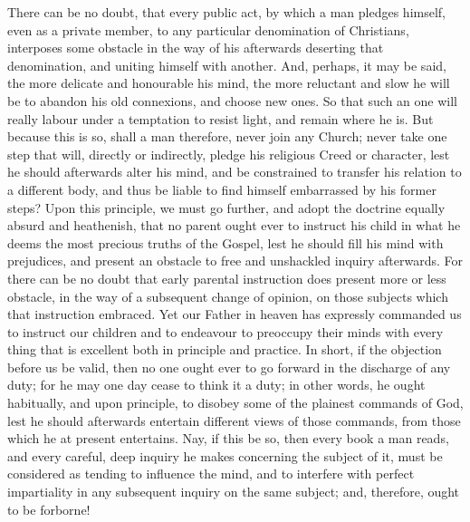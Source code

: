 \documentclass[
]{book}
\begin{document}
There can be no doubt, that every public act, by which a man pledges himself, even as a private member, to any particular denomination of Christians, interposes some obstacle in the way of his afterwards deserting that denomination, and uniting himself with another. And, perhaps, it may be said, the more delicate and honourable his mind, the more reluctant and slow he will be to abandon his old connexions, and choose new ones. So that such an one will really labour under a temptation to resist light, and remain where he is. But because this is so, shall a man therefore, never join any Church; never take one step that will, directly or indirectly, pledge his religious Creed or character, lest he should afterwards alter his mind, and be constrained to transfer his relation to a different body, and thus be liable to find himself embarrassed by his former steps? Upon this principle, we must go further, and adopt the doctrine equally absurd and heathenish, that no parent ought ever to instruct his child in what he deems the most precious truths of the Gospel, lest he should fill his mind with prejudices, and present an obstacle to free and unshackled inquiry afterwards. For there can be no doubt that early parental instruction does present more or less obstacle, in the way of a subsequent change of opinion, on those subjects which that instruction embraced. Yet our Father in heaven has expressly commanded us to instruct our children and to endeavour to preoccupy their minds with every thing that is excellent both in principle and practice. In short, if the objection before us be valid, then no one ought ever to go forward in the discharge of any duty; for he may one day cease to think it a duty; in other words, he ought habitually, and upon principle, to disobey some of the plainest commands of God, lest he should afterwards entertain different views of those commands, from those which he at present entertains. Nay, if this be so, then every book a man reads, and every careful, deep inquiry he makes concerning the subject of it, must be considered as tending to influence the mind, and to interfere with perfect impartiality in
any subsequent inquiry on the same subject; and, therefore, ought to be forborne!
\end{document}
